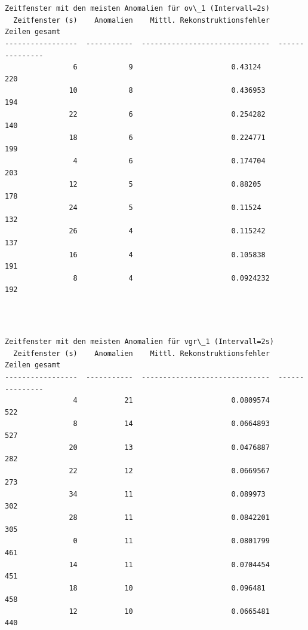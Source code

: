 \documentclass[11pt]{article}
\begin{document}
    \begin{center}
    \end{center}
    { \hspace*{\fill} \\}
    
    \begin{Verbatim}[commandchars=\\\{\}]

Zeitfenster mit den meisten Anomalien für ov\_1 (Intervall=2s)
  Zeitfenster (s)    Anomalien    Mittl. Rekonstruktionsfehler    Zeilen gesamt
-----------------  -----------  ------------------------------  ---------------
                6            9                       0.43124                220
               10            8                       0.436953               194
               22            6                       0.254282               140
               18            6                       0.224771               199
                4            6                       0.174704               203
               12            5                       0.88205                178
               24            5                       0.11524                132
               26            4                       0.115242               137
               16            4                       0.105838               191
                8            4                       0.0924232              192
    \end{Verbatim}

    \begin{center}
    \end{center}
    { \hspace*{\fill} \\}
    
    \begin{Verbatim}[commandchars=\\\{\}]

Zeitfenster mit den meisten Anomalien für vgr\_1 (Intervall=2s)
  Zeitfenster (s)    Anomalien    Mittl. Rekonstruktionsfehler    Zeilen gesamt
-----------------  -----------  ------------------------------  ---------------
                4           21                       0.0809574              522
                8           14                       0.0664893              527
               20           13                       0.0476887              282
               22           12                       0.0669567              273
               34           11                       0.089973               302
               28           11                       0.0842201              305
                0           11                       0.0801799              461
               14           11                       0.0704454              451
               18           10                       0.096481               458
               12           10                       0.0665481              440
    \end{Verbatim}
\end{document}
